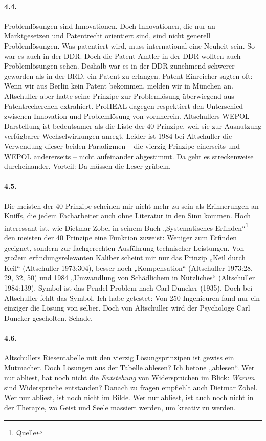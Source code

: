 \documentclass[12pt,a4paper]{article}
\begin{document}
\paragraph{4.4.}
Problemlösungen sind Innovationen. Doch Innovationen, die nur an Marktgesetzen
und Patentrecht orientiert sind, sind nicht generell Problemlösungen.  Was
patentiert wird, muss international eine Neuheit sein. So war es auch in der
DDR. Doch die Patent-Amtler in der DDR wollten auch Problemlösungen sehen.
Deshalb war es in der DDR zunehmend schwerer geworden als in der BRD, ein
Patent zu erlangen. Patent-Einreicher sagten oft: Wenn wir aus Berlin kein
Patent bekommen, melden wir in München an. Altschuller aber hatte seine
Prinzipe zur Problemlösung überwiegend aus Patentrecherchen extrahiert.
ProHEAL dagegen respektiert den Unterschied zwischen Innovation und
Problemlösung von vornherein. Altschullers WEPOL-Darstellung ist bedeutsamer
als die Liste der 40 Prinzipe, weil sie zur Ausnutzung verfügbarer
Wechselwirkungen anregt.  Leider ist 1984 bei Altschuller die Verwendung
dieser beiden Paradigmen – die vierzig Prinzipe einerseits und WEPOL
andererseits – nicht aufeinander abgestimmt. Da geht es streckenweise
durcheinander.  Vorteil: Da müssen die Leser grübeln.

\paragraph{4.5.}
Die meisten der 40 Prinzipe scheinen mir nicht mehr zu sein als Erinnerungen
an Kniffs, die jedem Facharbeiter auch ohne Literatur in den Sinn kommen.
Hoch interessant ist, wie Dietmar Zobel in seinem Buch „Systematisches
Erfinden“\footnote{Quelle} den meisten der 40 Prinzipe eine Funktion zuweist:
Weniger zum Erfinden geeignet, sondern zur fachgerechten Ausführung
technischer Leistungen. Von großem erfindungsrelevanten Kaliber scheint mir
nur das Prinzip „Keil durch Keil“ (Altschuller 1973:304), besser noch
„Kompensation“ (Altschuller 1973:28, 29, 32, 50) und 1984 „Umwandlung von
Schädlichem in Nützliches“ (Altschuller 1984:139). Symbol ist das
Pendel-Problem nach Carl Duncker (1935). Doch bei Altschuller fehlt das
Symbol.  Ich habe getestet: Von 250 Ingenieuren fand nur ein einziger die
Lösung von selber. Doch von Altschuller wird der Psychologe Carl Duncker
gescholten. Schade.

\paragraph{4.6.}
Altschullers Riesentabelle mit den vierzig Lösungsprinzipen ist gewiss ein
Mutmacher. Doch Lösungen aus der Tabelle ablesen? Ich betone „ablesen“. Wer
nur abliest, hat noch nicht die \emph{Entstehung} von Widersprüchen im Blick:
\emph{Warum} sind Widersprüche entstanden? Danach zu fragen empfiehlt auch
Dietmar Zobel. Wer nur abliest, ist noch nicht im Bilde. Wer nur abliest, ist
auch noch nicht in der Therapie, wo Geist und Seele massiert werden, um
kreativ zu werden.
\end{document}

